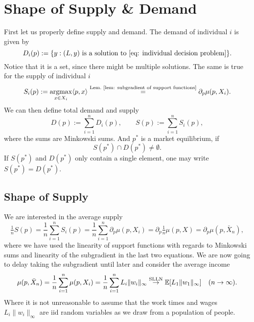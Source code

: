 \section{Shape of Supply \& Demand}
\label{sec: shape supply/demand}

First let us properly define supply and demand. The demand of individual \(i\)
is given by
\[
	D_i(p) := \{
		y : (L,y)
		\text{ is a solution to \eqref{eq: individual decision problem}}
	\}.
\]
Notice that it is a set, since there might be multiple solutions. The same is
true for the supply of individual \(i\)
\[
	S_i(p) := \operatorname*{argmax}_{x\in X_i} \langle p, x\rangle 
	\overset{\text{Lem.~\ref{lem: subgradient of support functions}}}=
	\partial_p \mu(p, X_i).
\]
We can then define total demand and supply
\[
	D(p) := \sum_{i=1}^n D_i(p),
	\qquad
	S(p) := \sum_{i=1}^n S_i(p),
\]
where the sums are Minkowski sums.
And \(p^*\) is a market equilibrium, if
\[
	S(p^*)\cap D(p^*)\neq\emptyset.
\]
If \(S(p^*)\) and \(D(p^*)\) only contain a single element, one may write
\(S(p^*)=D(p^*)\).

\subsection{Shape of Supply}

We are interested in the average supply
\[
	\tfrac1n S(p) = \frac1n \sum_{i=1}^n S_i(p)
	= \frac1n\sum_{i=1}^n \partial_p\mu(p, X_i)
	= \partial_p \tfrac1n \mu(p, X)
	= \partial_p \mu(p, \bar{X}_n),
\]
where we have used the linearity of support functions with regards to Minkowski
sums and linearity of the subgradient in the last two equations. We are now
going to delay taking the subgradient until later and consider the average
income
\[
	\mu(p,\bar{X}_n)
	= \frac1n \sum_{i=1}^n \mu(p, X_i)
	= \frac1n \sum_{i=1}^n L_i \|w_i\|_\infty
	\overset{\text{SLLN}}\to \mathbb{E}[L_1 \|w_1\|_\infty] \quad (n\to\infty).
\]
Where it is not unreasonable to assume that the work times and wages
\(L_i\|w_i\|_\infty\) are iid random variables as we draw from a population of
people.

